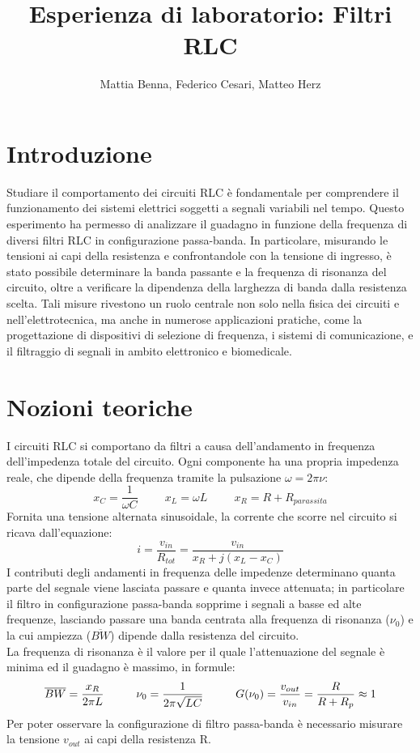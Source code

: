 \documentclass[9pt,a4paper,twocolumn,twoside]{tau-class/tau}
\title{Esperienza di laboratorio: Filtri RLC}
\author[b,c,3]{Mattia Benna, Federico Cesari, Matteo Herz}
\begin{document}
		
    \maketitle 
    \thispagestyle{firststyle} 
    \tauabstract
    
\vspace{-0.8cm}
\section{Introduzione}
Studiare il comportamento dei circuiti RLC è fondamentale per comprendere il funzionamento dei sistemi elettrici soggetti a segnali variabili nel tempo. Questo esperimento ha permesso di analizzare il guadagno in funzione della frequenza di diversi filtri RLC in configurazione passa-banda. In particolare, misurando le tensioni ai capi della resistenza e confrontandole con la tensione di ingresso, è stato possibile determinare la banda passante e la frequenza di risonanza del circuito, oltre a verificare la dipendenza della larghezza di banda dalla resistenza scelta. Tali misure rivestono un ruolo centrale non solo nella fisica dei circuiti e nell'elettrotecnica, ma anche in numerose applicazioni pratiche, come la progettazione di dispositivi di selezione di frequenza, i sistemi di comunicazione, e il filtraggio di segnali in ambito elettronico e biomedicale.

\section{Nozioni teoriche}
I circuiti RLC si comportano da filtri a causa dell'andamento in frequenza dell'impedenza totale del circuito. Ogni componente ha una propria impedenza reale, che dipende della frequenza tramite la pulsazione $\omega=2\pi\nu$:
\[
    x_C=\frac{1}{\omega C} \hspace{1cm}  x_L=\omega L  \hspace{1cm} x_R=R+R_{parassita}
\]
Fornita una tensione alternata sinusoidale, la corrente che scorre nel circuito si ricava dall'equazione:
\[
i=\frac{v_{in}}{R_{tot}}=\frac{v_{in}}{x_R+j(x_L-x_C)} 
\]
I contributi degli andamenti in frequenza delle impedenze determinano quanta parte del segnale viene lasciata passare e quanta invece attenuata; in particolare il filtro in configurazione passa-banda sopprime i segnali a basse ed alte frequenze, lasciando passare una banda centrata alla frequenza di risonanza ($\nu_0$) e la cui ampiezza ($\overline{BW}$) dipende dalla resistenza del circuito.\\
La frequenza di risonanza è il valore per il quale l'attenuazione del segnale è minima ed il guadagno è massimo, in formule: 
\[
\overline{BW}=\frac{x_R}{2\pi L}\hspace{1cm}  \nu_{0}=\frac{1}{2\pi\sqrt{LC}} \hspace{1cm} G(\nu_0)=\frac{v_{out}}{v_{in}}=\frac{R}{R+R_p}\approx 1\\
\] 
Per poter osservare la configurazione di filtro passa-banda è necessario misurare la tensione $v_{out}$ ai capi della resistenza R.
\end{document}
